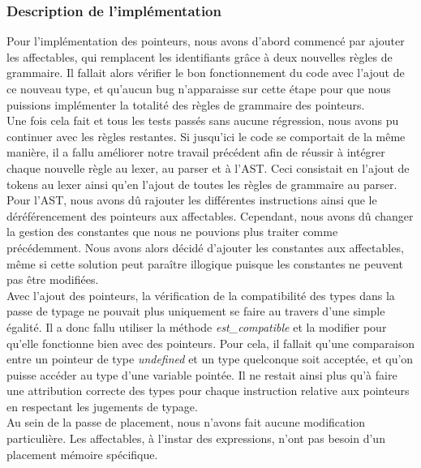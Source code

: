 \documentclass{article}
\begin{document}
\subsubsection{Description de l'implémentation}
Pour l'implémentation des pointeurs, nous avons d'abord commencé par ajouter les affectables, qui remplacent les identifiants grâce à deux nouvelles règles de grammaire. Il fallait alors vérifier le bon fonctionnement du code avec l'ajout de ce nouveau type, et qu'aucun bug n'apparaisse sur cette étape pour que nous puissions implémenter la totalité des règles de grammaire des pointeurs.\\

Une fois cela fait et tous les tests passés sans aucune régression, nous avons pu continuer avec les règles restantes. Si jusqu'ici le code se comportait de la même manière, il a fallu améliorer notre travail précédent afin de réussir à intégrer chaque nouvelle règle au lexer, au parser et à l'AST. Ceci consistait en l'ajout de tokens au lexer ainsi qu'en l'ajout de toutes les règles de grammaire au parser. Pour l'AST, nous avons dû rajouter les différentes instructions ainsi que le déréférencement des pointeurs aux affectables. Cependant, nous avons dû changer la gestion des constantes que nous ne pouvions plus traiter comme précédemment. Nous avons alors décidé d'ajouter les constantes aux affectables, même si cette solution peut paraître illogique puisque les constantes ne peuvent pas être modifiées.\\

Avec l'ajout des pointeurs, la vérification de la compatibilité des types dans la passe de typage ne pouvait plus uniquement se faire au travers d'une simple égalité. Il a donc fallu utiliser la méthode \textit{est\_compatible} et la modifier pour qu'elle fonctionne bien avec des pointeurs. Pour cela, il fallait qu'une comparaison entre un pointeur de type \textit{undefined} et un type quelconque soit acceptée, et qu'on puisse accéder au type d'une variable pointée. Il ne restait ainsi plus qu'à faire une attribution correcte des types pour chaque instruction relative aux pointeurs en respectant les jugements de typage.\\

Au sein de la passe de placement, nous n'avons fait aucune modification particulière. Les affectables, à l'instar des expressions, n'ont pas besoin d'un placement mémoire spécifique.\\
\end{document}
